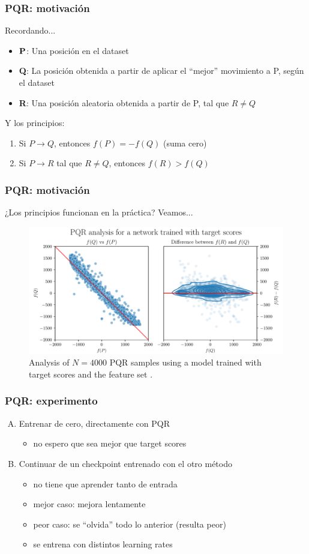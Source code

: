 
\begin{frame}
\frametitle{PQR: motivación}
Recordando...
\begin{itemize}
\item $\bf P$: Una posición en el dataset
\item \textbf{Q}: La posición obtenida a partir de aplicar el \enquote{mejor} movimiento a P, según el dataset
\item \textbf{R}: Una posición aleatoria obtenida a partir de P, tal que $R \neq Q$
\end{itemize}
\pause
Y los principios:
\begin{enumerate}
\item Si $P \rightarrow Q$, entonces $f(P)=-f(Q)$ (suma cero)
\item Si $P \rightarrow R$ tal que $R \neq Q$, entonces $f(R) > f(Q)$
\end{enumerate}
\end{frame}


\begin{frame}
\frametitle{PQR: motivación}
¿Los principios funcionan en la práctica? Veamos...
\begin{figure}
\centering
\includegraphics[width=\textwidth]{../thesis/dynamic/output/pqr_eval.pdf}
\caption{Analysis of $N=4000$ PQR samples using a model trained with target scores and the feature set .}
\end{figure}
\end{frame}

\begin{frame}
\frametitle{PQR: experimento}
\begin{enumerate}[A.]
\item Entrenar de cero, directamente con PQR
\begin{itemize}
\item no espero que sea mejor que target scores
\end{itemize}
\pause
\item Continuar de un checkpoint entrenado con el otro método
\begin{itemize}
\item no tiene que aprender tanto de entrada
\item mejor caso: mejora lentamente
\item peor caso: se \enquote{olvida} todo lo anterior (resulta peor)
\item se entrena con distintos learning rates
\end{itemize}
\end{enumerate}
\end{frame}


